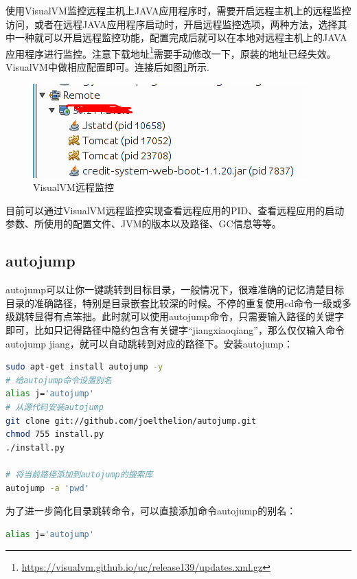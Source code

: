 \documentclass[letter]{book}
\begin{document}
使用VisualVM监控远程主机上JAVA应用程序时，需要开启远程主机上的远程监控访问，或者在远程JAVA应用程序启动时，开启远程监控选项，两种方法，选择其中一种就可以开启远程监控功能，配置完成后就可以在本地对远程主机上的JAVA应用程序进行监控。注意下载地址\footnote{\url{https://visualvm.github.io/uc/release139/updates.xml.gz}}需要手动修改一下，原装的地址已经失效。VisualVM中做相应配置即可。连接后如图\ref{fig:visualvmconnectremote}所示.

\begin{figure}[htbp]
	\centering
	\includegraphics[scale=0.7]{visualvmconnectremote.png}
	\caption{VisualVM远程监控}
	\label{fig:visualvmconnectremote}
\end{figure}

目前可以通过VisualVM远程监控实现查看远程应用的PID、查看远程应用的启动参数、所使用的配置文件、JVM的版本以及路径、GC信息等等。


\subsection{autojump}

autojump可以让你一键跳转到目标目录，一般情况下，很难准确的记忆清楚目标目录的准确路径，特别是目录嵌套比较深的时候。不停的重复使用cd命令一级或多级跳转显得有点笨拙。此时就可以使用autojump命令，只需要输入路径的关键字即可，比如只记得路径中隐约包含有关键字“jiangxiaoqiang”，那么仅仅输入命令autojump jiang，就可以自动跳转到对应的路径下。安装autojump：

\begin{lstlisting}[language=Bash]
sudo apt-get install autojump -y
# 给autojump命令设置别名
alias j='autojump'
# 从源代码安装autojump
git clone git://github.com/joelthelion/autojump.git
chmod 755 install.py
./install.py

# 将当前路径添加到autojump的搜索库
autojump -a 'pwd'
\end{lstlisting}

为了进一步简化目录跳转命令，可以直接添加命令autojump的别名：

\begin{lstlisting}[language=Bash]
alias j='autojump'
\end{lstlisting}
\end{document}
